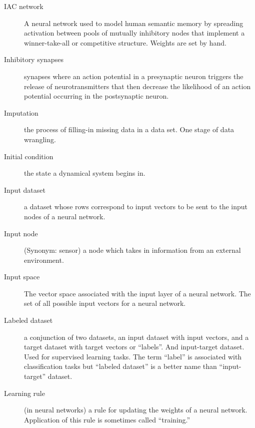 \begin{description}

\item[IAC network] A neural network used to model human semantic memory by spreading activation between pools of mutually inhibitory nodes that implement a winner-take-all or competitive structure. Weights are set by hand. 

\item[Inhibitory synapses] synapses where an action potential in a presynaptic neuron triggers the release of neurotransmitters that then decrease the likelihood of an action potential occurring in the postsynaptic neuron.

\item[Imputation] the process of filling-in missing data in a data set. One stage of data wrangling.

\item[Initial condition] the state a dynamical system begins in.

\item[Input dataset] a dataset whose rows correspond to input vectors to be sent to the input nodes of a neural network.

\item[Input node] (Synonym: sensor) a node which takes in information from an external environment. 

\item[Input space] The vector space associated with the input layer of a neural network. The set of all possible input vectors for a neural network.





\item[Labeled dataset] a conjunction of two datasets, an input dataset with input vectors, and a target dataset with target vectors or ``labels''. And input-target dataset. Used for supervised learning tasks. The term ``label'' is associated with classification tasks but ``labeled dataset'' is a better name than ``input-target'' dataset.

\item[Learning rule] (in neural networks) a rule for updating the weights of a neural network. Application of this rule is sometimes called ``training.''


\end{description}
